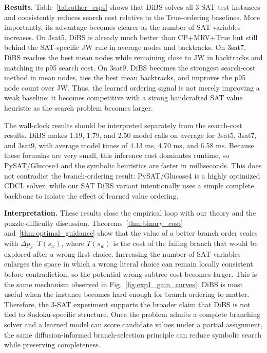 \documentclass[lettersize,journal]{IEEEtran}
\begin{document}
\textbf{Results.} Table~\ref{tab:other_csps} shows that DiBS solves all 3-SAT test instances and consistently reduces search cost relative to the True-ordering baselines. More importantly, its advantage becomes clearer as the number of SAT variables increases. On 3sat5, DiBS is already much better than CP+MRV+True but still behind the SAT-specific JW rule in average nodes and backtracks. On 3sat7, DiBS reaches the best mean nodes while remaining close to JW in backtracks and matching its p95 search cost. On 3sat9, DiBS becomes the strongest search-cost method in mean nodes, ties the best mean backtracks, and improves the p95 node count over JW. Thus, the learned ordering signal is not merely improving a weak baseline; it becomes competitive with a strong handcrafted SAT value heuristic as the search problem becomes larger.

The wall-clock results should be interpreted separately from the search-cost results. DiBS makes 1.19, 1.79, and 2.50 model calls on average for 3sat5, 3sat7, and 3sat9, with average model times of 4.13 ms, 4.70 ms, and 6.58 ms. Because these formulas are very small, this inference cost dominates runtime, so PySAT/Glucose4 and the symbolic heuristics are faster in milliseconds. This does not contradict the branch-ordering result: PySAT/Glucose4 is a highly optimized CDCL solver, while our SAT DiBS variant intentionally uses a simple complete backbone to isolate the effect of learned value ordering.

\textbf{Interpretation.} These results close the empirical loop with our theory and the puzzle-difficulty discussion. Theorems~\ref{thm:binary_cost} and~\ref{thm:optimal_guidance} show that the value of a better branch order scales with \(\Delta p_s\cdot T(s_w)\), where \(T(s_w)\) is the cost of the failing branch that would be explored after a wrong first choice. Increasing the number of SAT variables enlarges the space in which a wrong literal choice can remain locally consistent before contradiction, so the potential wrong-subtree cost becomes larger. This is the same mechanism observed in Fig.~\ref{fig:exp1_gain_curves}: DiBS is most useful when the instance becomes hard enough for branch ordering to matter. Therefore, the 3-SAT experiment supports the broader claim that DiBS is not tied to Sudoku-specific structure. Once the problem admits a complete branching solver and a learned model can score candidate values under a partial assignment, the same diffusion-informed branch-selection principle can reduce symbolic search while preserving completeness.
\end{document}
